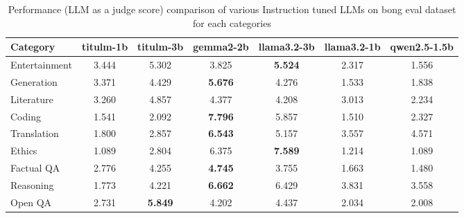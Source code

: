 \begin{table*}[htb!]
    \centering
    \begin{tabular}{lcccccc}
        \toprule
        Category & titulm-1b & titulm-3b & gemma2-2b & llama3.2-3b & llama3.2-1b & qwen2.5-1.5b \\
        \midrule
        Entertainment  & 3.444  & 5.302  & 3.825  & \textbf{5.524}  & 2.317  & 1.556  \\
        Generation     & 3.371  & 4.429  & \textbf{5.676}  & 4.276  & 1.533  & 1.838  \\
        Literature     & 3.260  & 4.857  & 4.377  & 4.208  & 3.013  & 2.234  \\
        Coding        & 1.541  & 2.092  & \textbf{7.796}  & 5.857  & 1.510  & 2.327  \\
        Translation    & 1.800  & 2.857  & \textbf{6.543}  & 5.157  & 3.557  & 4.571  \\
        Ethics        & 1.089  & 2.804  & 6.375  & \textbf{7.589}  & 1.214  & 1.089  \\
        Factual QA    & 2.776  & 4.255  & \textbf{4.745}  & 3.755  & 1.663  & 1.480  \\
        Reasoning     & 1.773  & 4.221  & \textbf{6.662}  & 6.429  & 3.831  & 3.558  \\
        Open QA       & 2.731  & \textbf{5.849}  & 4.202  & 4.437  & 2.034  & 2.008  \\
        \bottomrule
    \end{tabular}
    \caption{Performance (LLM as a judge score) comparison of various Instruction tuned LLMs on bong eval dataset for each categories}
    \label{tab:category_comparison_bong_category}
\end{table*}
